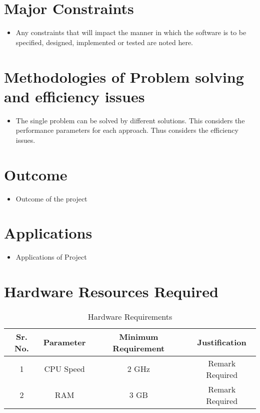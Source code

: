 \documentclass[oneside,a4paper,12pt]{report}
\begin{document}
\section{Major Constraints}
\begin{itemize}
\item Any constraints that will impact the manner in which the software is to be specified, designed, implemented or tested are noted here.
\end{itemize}

\section{Methodologies of Problem solving and efficiency issues}
\begin{itemize}
	\item The single problem can be solved by different solutions.  This considers the performance parameters for each approach. Thus considers the efficiency issues.
\end{itemize}



\section{Outcome}
\begin{itemize}
\item Outcome of the project
\end{itemize}

\section{Applications}
\begin{itemize}
\item Applications of Project
\end{itemize}

\section{Hardware Resources Required}
\begin{table}[!htbp]
\begin{center}
\def\arraystretch{1.5}
  \begin{tabular}{| c | c | c | c |}
\hline
Sr. No. &	Parameter &	Minimum Requirement & Justification \\
\hline
1 &	CPU Speed &	 2 GHz  & Remark Required\\
\hline
2 &	RAM  &	3 GB &  Remark Required\\
 \hline
\end{tabular}
 \caption { Hardware Requirements }
 \label{tab:hreq}
\end{center}

\end{table}
\end{document}
